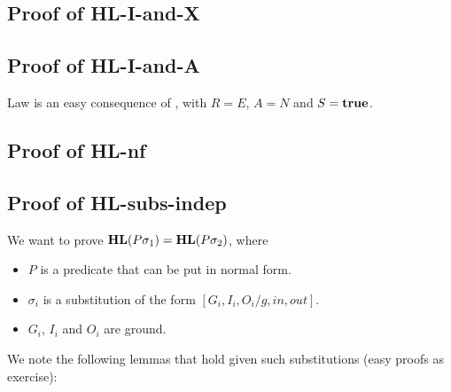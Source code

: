 \newpage
\subsection{Proof of \textsf{HL-I-and-X}}

\subsection{Proof of \textsf{HL-I-and-A}}

Law  is an easy consequence of ,
with $R=E$, $A=N$ and $S=\mathbf{true}$.

\newpage
\subsection{Proof of \textsf{HL-nf}}



\newpage
\subsection{Proof of \textsf{HL-subs-indep}}

We want to prove $\mathbf{HL}(P\sigma_1)=\mathbf{HL}(P\sigma_2)$, where
\begin{itemize}
  \item $P$ is a predicate that can be put in normal form.
  \item $\sigma_i$ is a substitution of the form $[G_i,I_i,O_i/g,in,out]$.
  \item $G_i$, $I_i$ and $O_i$ are ground.
\end{itemize}
We note the following lemmas that hold given such substitutions
(easy proofs as exercise):

